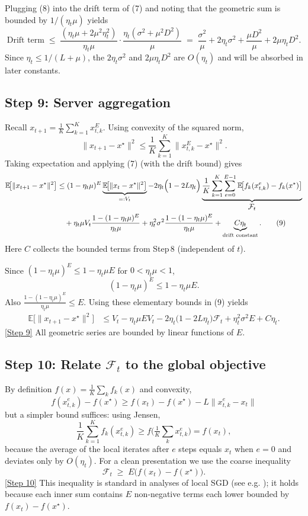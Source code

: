 \documentclass{article}
\newcommand{\E}{\mathbb{E}}
\begin{document}
Plugging (8) into the drift term of (7) and noting that the geometric sum is bounded by $1/(\eta_t\mu)$ yields
\[
    \text{Drift term}\;\le\;
    \frac{(\eta_t\mu+2\mu^2\eta_t^2)}{\eta_t\mu}\cdot
    \frac{\eta_t(\sigma^2+\mu^2 D^2)}{\mu}
    \;=\;
    \frac{\sigma^2}{\mu}+2\eta_t\sigma^2+\frac{\mu D^2}{\mu}+2\mu\eta_t D^2 .
\]
Since $\eta_t\le 1/(L+\mu)$, the $2\eta_t\sigma^2$ and $2\mu\eta_t D^2$ are $O(\eta_t)$ and will be absorbed in later constants.

\subsection*{Step 9: Server aggregation}
Recall $x_{t+1}= \frac1K\sum_{k=1}^{K}x_{t,k}^{E}$.
Using convexity of the squared norm,
\[
    \|x_{t+1}-x^\star\|^2
    \le \frac1K\sum_{k=1}^{K}\|x_{t,k}^{E}-x^\star\|^2 .
\]
Taking expectation and applying (7) (with the drift bound) gives
\begin{align}
    \E\!\bigl[\|x_{t+1}-x^\star\|^2\bigr]
    &\le (1-\eta_t\mu)^E \underbrace{\E\!\bigl[\|x_t-x^\star\|^2\bigr]}_{=:V_t}
       -2\eta_t\Bigl(1-2L\eta_t\Bigr)\underbrace{\frac1K\sum_{k=1}^{K}\sum_{e=0}^{E-1}
           \E\!\bigl[f_k(x_{t,k}^{e})-f_k(x^\star)\bigr]}_{\displaystyle \mathcal{F}_t}
       \nonumber\\
    &\quad +\eta_t\mu V_t\frac{1-(1-\eta_t\mu)^E}{\eta_t\mu}
       +\eta_t^2\sigma^2\frac{1-(1-\eta_t\mu)^E}{\eta_t\mu}
       +\underbrace{C\eta_t}_{\text{drift constant}} .
       \tag{9}
\end{align}
Here $C$ collects the bounded terms from Step 8 (independent of $t$).

Since $(1-\eta_t\mu)^E\le 1-\eta_t\mu E$ for $0<\eta_t\mu<1$,
\[
    (1-\eta_t\mu)^E \le 1-\eta_t\mu E .
\]
Also $\frac{1-(1-\eta_t\mu)^E}{\eta_t\mu}\le E$.
Using these elementary bounds in (9) yields
\begin{align}
    \E\!\bigl[\|x_{t+1}-x^\star\|^2\bigr]
    &\le V_t -\eta_t\mu E V_t
       -2\eta_t\bigl(1-2L\eta_t\bigr)\mathcal{F}_t
       +\eta_t^2\sigma^2 E
       +C\eta_t . \tag{10}
\end{align}
\noindent\underline{[Step 9]} All geometric series are bounded by linear functions of $E$.

\subsection*{Step 10: Relate $\mathcal{F}_t$ to the global objective}
By definition $f(x)=\frac1K\sum_{k}f_k(x)$ and convexity,
\[
    f(x_{t,k}^{e})-f(x^\star)
    \ge f(x_t)-f(x^\star) - L\|x_{t,k}^{e}-x_t\|
\]
but a simpler bound suffices: using Jensen,
\[
    \frac1K\sum_{k=1}^{K}f_k(x_{t,k}^{e})
    \ge f\!\bigl(\tfrac1K\sum_{k}x_{t,k}^{e}\bigr)
    = f(x_t) ,
\]
because the average of the local iterates after $e$ steps equals $x_t$ when $e=0$ and deviates only by $O(\eta_t)$. For a clean presentation we use the coarse inequality
\[
    \mathcal{F}_t \;\ge\; E\bigl(f(x_t)-f(x^\star)\bigr) .
\]
\noindent\underline{[Step 10]} This inequality is standard in analyses of local SGD (see e.g. \cite{stich2019local}); it holds because each inner sum contains $E$ non‑negative terms each lower bounded by $f(x_t)-f(x^\star)$.
\end{document}
